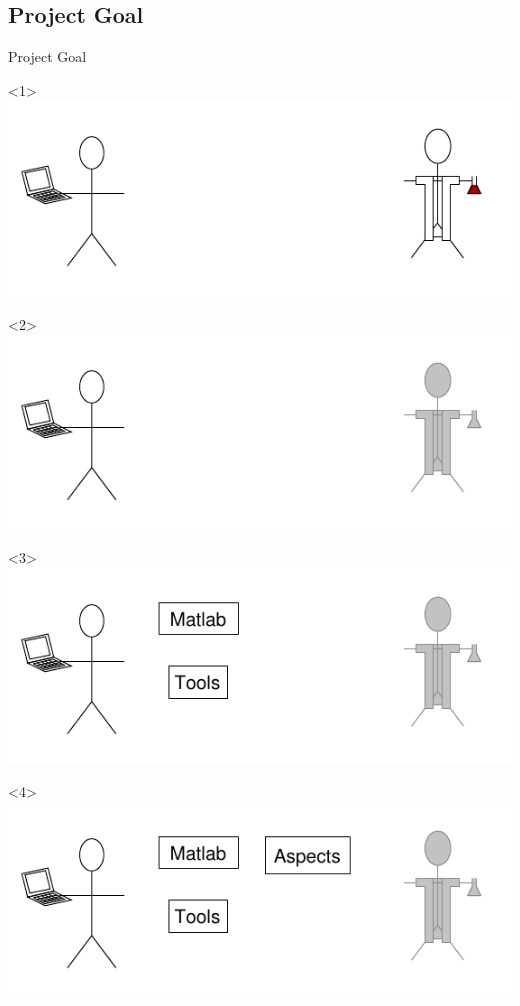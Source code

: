 \subsection{Project Goal}
\begin{frame}{Project Goal}
  \begin{center}
    \begin{onlyenv}<1>
      \includegraphics{images/perspectives1.pdf}
    \end{onlyenv}
    \begin{onlyenv}<2>
      \includegraphics{images/perspectives2_comp.pdf}
    \end{onlyenv}
    \begin{onlyenv}<3>
      \includegraphics{images/perspectives3_comp.pdf}
    \end{onlyenv}
    \begin{onlyenv}<4>
      \includegraphics{images/perspectives4_comp.pdf}

\end{onlyenv}
\end{center}
\end{frame}
